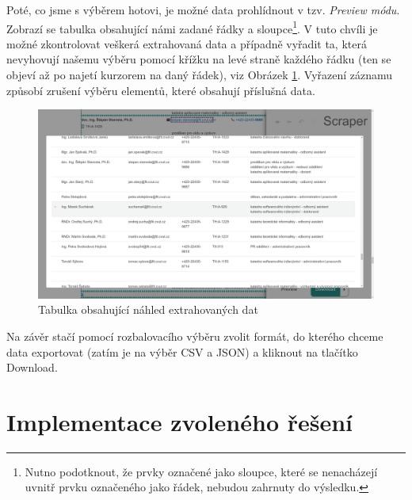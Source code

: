 \documentclass[thesis=B,czech]{FITthesis2}[2012/06/26]
\begin{document}
	Poté, co jsme s výběrem hotovi, je možné data prohlídnout v tzv. \textit{Preview módu}. Zobrazí se tabulka obsahující námi zadané řádky a sloupce\footnote{Nutno podotknout, že prvky označené jako sloupce, které se nenacházejí uvnitř prvku označeného jako řádek, nebudou zahrnuty do výsledku.}. V tuto chvíli je možné zkontrolovat veškerá extrahovaná data a případně vyřadit ta, která nevyhovují našemu výběru pomocí křížku na levé straně každého řádku (ten se objeví až po najetí kurzorem na daný řádek), viz Obrázek \ref{fig:scraper_preview_mode}. Vyřazení záznamu způsobí zrušení výběru elementů, které obsahují příslušná data.
	\begin{figure}[h]
		\includegraphics[width=\linewidth]{images/Scraper_preview_mode.png}
		\caption{Tabulka obsahující náhled extrahovaných dat}
		\label{fig:scraper_preview_mode}
	\end{figure}

	Na závěr stačí pomocí rozbalovacího výběru zvolit formát, do kterého chceme data exportovat (zatím je na výběr CSV a JSON) a kliknout na tlačítko \textsf{Download}.
	
	\section{Implementace zvoleného řešení}
\end{document}
